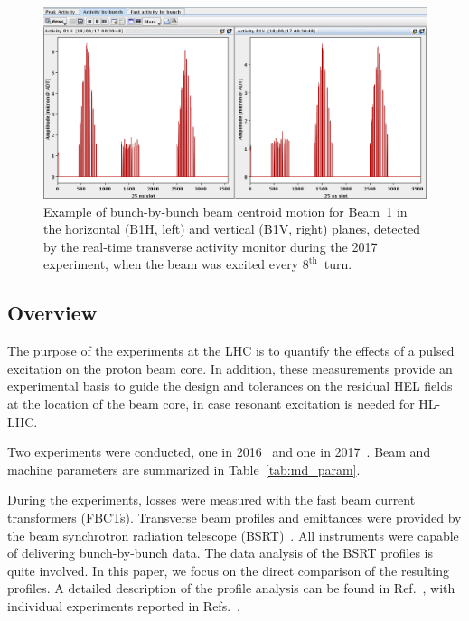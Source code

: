 \documentclass[%
 reprint,
 amsmath,amssymb,
 aps,
prstab,
longbibliography
]{revtex4-1}
\begin{document}
\begin{figure}
  \includegraphics[width=\textwidth]{bunchfilling_measured.png}	
  \caption{Example of bunch-by-bunch beam centroid motion for Beam~1
    in the horizontal (B1H, left) and vertical (B1V, right) planes,
    detected by the real-time transverse activity monitor during the
    2017 experiment, when the beam was excited every
    $8^\mathrm{th}$~turn.}
  \label{fig:fill_meas} 
\end{figure}

\subsection{Overview}
\label{sec:exp_sum}

The purpose of the experiments at the LHC is to quantify the effects
of a pulsed excitation on the proton beam core. In addition, these
measurements provide an experimental basis to guide the design and
tolerances on the residual HEL fields at the location of the beam
core, in case resonant excitation is needed for HL-LHC.

Two experiments were conducted, one in 2016~\cite{resexmd2016} and one
in 2017~\cite{resexmd2017}. Beam and machine parameters are summarized
in Table~\ref{tab:md_param}.

During the experiments, losses were measured with the fast beam
current transformers (FBCTs). Transverse beam profiles and emittances
were provided by the beam synchrotron radiation telescope
(BSRT)~\cite{Trad:PhD:2015}. All instruments were capable of
delivering bunch-by-bunch data. The data analysis of the BSRT profiles
is quite involved. In this paper, we focus on the direct comparison of
the resulting profiles. A detailed description of the profile analysis
can be found in Ref.~\cite{bsrtprofinj}, with individual experiments
reported in Refs.~\cite{resexmd2016, resexmd2017}.
\end{document}
